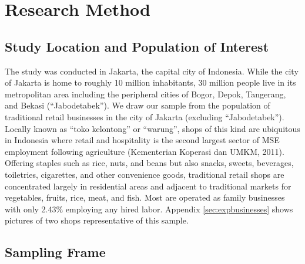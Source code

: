 \documentclass[11.5pt]{article}
\begin{document}
\section{\textbf{Research Method}}\label{sec.method}


\subsection{Study Location and Population of Interest}

The study was conducted in Jakarta, the capital city of Indonesia. While the city of Jakarta is home to roughly 10 million inhabitants, 30 million people live in its metropolitan area including the peripheral cities of Bogor, Depok, Tangerang, and Bekasi (``Jabodetabek''). We draw our sample from the population of traditional retail businesses in the city of Jakarta (excluding ``Jabodetabek''). Locally known as ``toko kelontong'' or ``warung'', shops of this kind are ubiquitous in Indonesia where retail and hospitality is the second largest sector of MSE employment following agriculture (Kementerian Koperasi dan UMKM, 2011). Offering staples such as rice, nuts, and beans but also snacks, sweets, beverages, toiletries, cigarettes, and other convenience goods, traditional retail shops are concentrated largely in residential areas and adjacent to traditional markets for vegetables, fruits, rice, meat, and fish. Most are operated as family businesses with only 2.43\% employing any hired labor. Appendix \ref{sec:expbusinesses} shows pictures of two shops representative of this sample.


\subsection{Sampling Frame}
\end{document}
